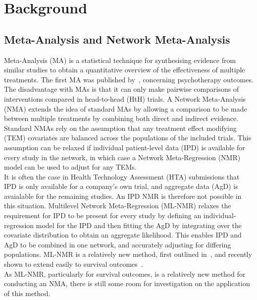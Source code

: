 \chapter{Background}\label{backChap}

\section{Meta-Analysis and Network Meta-Analysis}
Meta-Analysis (MA) is a statistical technique for synthesising evidence from similar studies to obtain a quantitative overview of the effectiveness of multiple treatments. The first MA was published by~\cite{smith1977}, concerning psychotherapy outcomes. The disadvantage with MAs is that it can only make pairwise comparisons of interventions compared in head-to-head (HtH) trials. A Network Meta-Analysis (NMA) extends the idea of standard MAs by allowing a comparison to be made between multiple treatments by combining both direct and indirect evidence. Standard NMAs rely on the assumption that any treatment effect modifying (TEM) covariates are balanced across the populations of the included trials. This assumption can be relaxed if individual patient-level data (IPD) is available for every study in the network, in which case a Network Meta-Regression (NMR) model can be used to adjust for any TEMs. \\

It is often the case in Health Technology Assessment (HTA) submissions that IPD is only available for a company's own trial, and aggregate data (AgD) is avaialable for the remaining studies. An IPD NMR is therefore not possible in this situation. Multilevel Network Meta-Regression (ML-NMR) relaxes the requirement for IPD to be present for every study by defining an individual-regression model for the IPD and then fitting the AgD by integrating over the covariate distribution to obtain an aggregate likelihood. This enables IPD and AgD to be combined in one network, and accurately adjusting for differing populations. ML-NMR is a relatively new method, first outlined in~\cite{phillippo2020}, and recently shown to extend easily to survival outcomes~\cite{phillippo2024}. \\

As ML-NMR, particularly for survival outcomes, is a relatively new method for conducting an NMA, there is still some room for investigation on the application of this method. 

